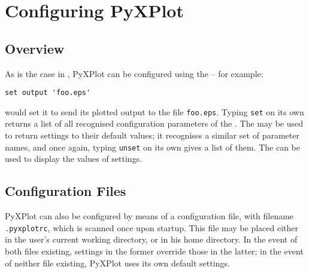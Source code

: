%
%
%
%
%



\chapter{Configuring PyXPlot}

\section{Overview}

\label{configuration}

As is the case in \gnuplot, PyXPlot can be configured using the 
-- for example:

\begin{verbatim}set output 'foo.eps'\end{verbatim}

\noindent would set it to send its plotted output to the file {\tt foo.eps}.
Typing {\tt set} on its own returns a list of all recognised configuration
parameters of the . The  may be used to return
settings to their default values; it recognises a similar set of parameter
names, and once again, typing {\tt unset} on its own gives a list of them. The
 can be used to display the values of settings.

\section{Configuration Files}
\label{config_files}

PyXPlot can also be configured by means of a configuration file, with filename
{\tt .pyxplotrc}, which is scanned once upon startup. This file may be
placed either in the user's current working directory, or in his home
directory. In the event of both files existing, settings in the former override
those in the latter; in the event of neither file existing, PyXPlot uses its
own default settings.

